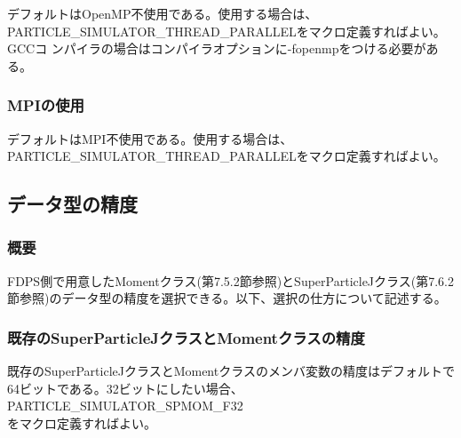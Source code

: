デフォルトはOpenMP不使用である。使用する場合は、
\\ PARTICLE\_SIMULATOR\_THREAD\_PARALLELをマクロ定義すればよい。GCCコ
ンパイラの場合はコンパイラオプションに-fopenmpをつける必要がある。

\subsubsection{MPIの使用}

デフォルトはMPI不使用である。使用する場合は、
PARTICLE\_SIMULATOR\_THREAD\_PARALLELをマクロ定義すればよい。

\subsection{データ型の精度}
\subsubsection{概要}
FDPS側で用意したMomentクラス(第7.5.2節参照)とSuperParticleJクラス(第7.6.2節参照)のデータ型の精度を選択できる。以下、選択の仕方について記述する。

\subsubsection{既存のSuperParticleJクラスとMomentクラスの精度}
既存のSuperParticleJクラスとMomentクラスのメンバ変数の精度はデフォルトで64ビットである。32ビットにしたい場合、\\
PARTICLE\_SIMULATOR\_SPMOM\_F32 \\
をマクロ定義すればよい。



